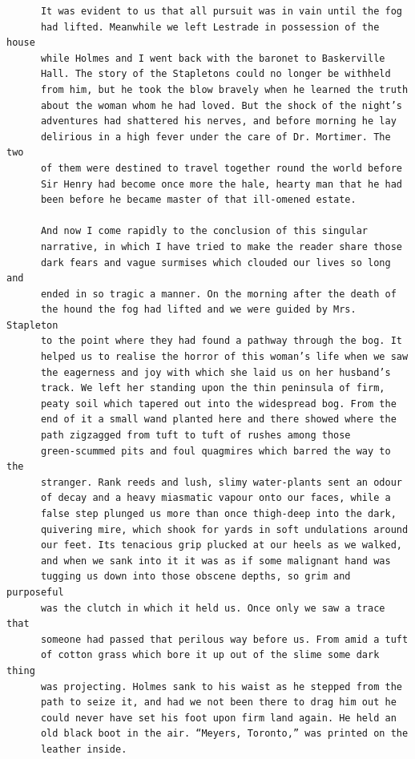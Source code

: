\documentclass{article}
\begin{document}
\begin{verbatim}
      It was evident to us that all pursuit was in vain until the fog
      had lifted. Meanwhile we left Lestrade in possession of the house
      while Holmes and I went back with the baronet to Baskerville
      Hall. The story of the Stapletons could no longer be withheld
      from him, but he took the blow bravely when he learned the truth
      about the woman whom he had loved. But the shock of the night’s
      adventures had shattered his nerves, and before morning he lay
      delirious in a high fever under the care of Dr. Mortimer. The two
      of them were destined to travel together round the world before
      Sir Henry had become once more the hale, hearty man that he had
      been before he became master of that ill-omened estate.

      And now I come rapidly to the conclusion of this singular
      narrative, in which I have tried to make the reader share those
      dark fears and vague surmises which clouded our lives so long and
      ended in so tragic a manner. On the morning after the death of
      the hound the fog had lifted and we were guided by Mrs. Stapleton
      to the point where they had found a pathway through the bog. It
      helped us to realise the horror of this woman’s life when we saw
      the eagerness and joy with which she laid us on her husband’s
      track. We left her standing upon the thin peninsula of firm,
      peaty soil which tapered out into the widespread bog. From the
      end of it a small wand planted here and there showed where the
      path zigzagged from tuft to tuft of rushes among those
      green-scummed pits and foul quagmires which barred the way to the
      stranger. Rank reeds and lush, slimy water-plants sent an odour
      of decay and a heavy miasmatic vapour onto our faces, while a
      false step plunged us more than once thigh-deep into the dark,
      quivering mire, which shook for yards in soft undulations around
      our feet. Its tenacious grip plucked at our heels as we walked,
      and when we sank into it it was as if some malignant hand was
      tugging us down into those obscene depths, so grim and purposeful
      was the clutch in which it held us. Once only we saw a trace that
      someone had passed that perilous way before us. From amid a tuft
      of cotton grass which bore it up out of the slime some dark thing
      was projecting. Holmes sank to his waist as he stepped from the
      path to seize it, and had we not been there to drag him out he
      could never have set his foot upon firm land again. He held an
      old black boot in the air. “Meyers, Toronto,” was printed on the
      leather inside.


\end{verbatim}
\end{document}
